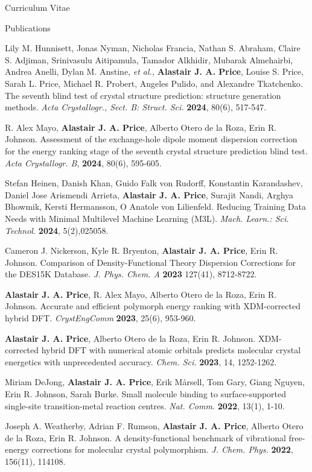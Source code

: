 \documentclass[a4paper,oneside,11pt]{article}
\begin{document}
\begin{cv}{Curriculum Vitae}
\begin{cvlist}{Publications}
          \item[12.] Lily M. Hunnisett, Jonas Nyman, Nicholas Francia, Nathan S. Abraham, Claire S. Adjiman, Srinivasulu Aitipamula, Tamador Alkhidir, Mubarak Almehairbi, Andrea Anelli, Dylan M. Anstine, {\it et al.,} {\bf Alastair J. A. Price}, Louise S. Price, Sarah L. Price, Michael R. Probert, Angeles Pulido, and Alexandre Tkatchenko. The seventh blind test of crystal structure prediction: structure generation methods. {\it Acta Crystallogr., Sect. B: Struct. Sci.} {\bf 2024}, 80(6), 517-547.
          \item[11.]  R. Alex Mayo, {\bf Alastair J. A. Price}, Alberto Otero de la Roza, Erin R. Johnson. Assessment of the exchange-hole dipole moment dispersion correction for the energy ranking stage of the seventh crystal structure prediction blind test. {\it Acta Crystallogr. B}, {\bf 2024}, 80(6), 595-605.
          \item[10.] Stefan Heinen, Danish Khan, Guido Falk von Rudorff, Konstantin Karandashev, Daniel Jose Arismendi Arrieta, \textbf{Alastair J. A. Price}, Surajit Nandi, Arghya Bhowmik, Kersti Hermansson, O Anatole von Lilienfeld. Reducing Training Data Needs with Minimal Multilevel Machine Learning (M3L). {\it Mach. Learn.: Sci. Technol.} {\bf2024}, 5(2),025058.
          \item[9.] Cameron J. Nickerson, Kyle R. Bryenton, {\bf Alastair J. A. Price}, Erin R. Johnson. Comparison of Density-Functional Theory Dispersion Corrections for the DES15K Database. {\it J. Phys. Chem. A} {\bf 2023} 127(41), 8712-8722.
          \item[8.] {\bf Alastair J. A. Price}, R. Alex Mayo, Alberto Otero de la Roza, Erin R. Johnson. Accurate and efficient polymorph energy ranking with XDM-corrected hybrid DFT. {\it CrystEngComm} {\bf 2023}, 25(6), 953-960.
          \item[7.] {\bf Alastair J. A. Price}, Alberto Otero de la Roza, Erin R. Johnson. XDM-corrected hybrid DFT with numerical atomic orbitals predicts molecular crystal energetics with unprecedented accuracy. {\it Chem. Sci.} {\bf 2023}, 14, 1252-1262.
          \item[6.] Miriam DeJong, {\bf Alastair J. A. Price}, Erik Mårsell, Tom Gary, Giang Nguyen, Erin R. Johnson, Sarah Burke. Small molecule binding to surface-supported single-site transition-metal reaction centres. {\it Nat. Comm.}  {\bf 2022}, 13(1), 1-10.
          \item[5.] Joseph A. Weatherby, Adrian F. Rumson, {\bf Alastair J. A. Price}, Alberto Otero de la Roza, Erin R. Johnson. A density-functional benchmark of vibrational free-energy corrections for molecular crystal polymorphism. {\it J. Chem. Phys.} {\bf 2022}, 156(11), 114108.

\end{cvlist}
\end{cv}
\end{document}
